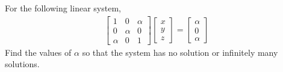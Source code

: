 \begin{Exercise}
For the following linear system,
\begin{align*}
\begin{bmatrix}
1 & 0 & \alpha \\
0 & \alpha & 0 \\
\alpha & 0 & 1
\end{bmatrix}
\begin{bmatrix}
x \\
y \\
z
\end{bmatrix}
=
\begin{bmatrix}
\alpha \\
0 \\
\alpha
\end{bmatrix}   
\end{align*}
Find the values of $\alpha$ so that the system has no solution or infinitely many solutions.
\end{Exercise}
